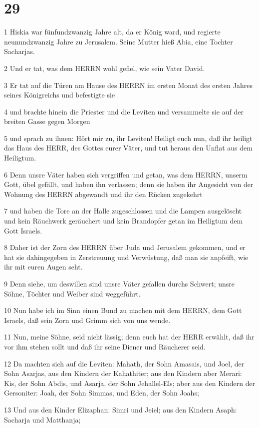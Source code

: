 \chapter{29}

\par 1 Hiskia war fünfundzwanzig Jahre alt, da er König ward, und regierte neunundzwanzig Jahre zu Jerusalem. Seine Mutter hieß Abia, eine Tochter Sacharjas.
\par 2 Und er tat, was dem HERRN wohl gefiel, wie sein Vater David.
\par 3 Er tat auf die Türen am Hause des HERRN im ersten Monat des ersten Jahres seines Königreichs und befestigte sie
\par 4 und brachte hinein die Priester und die Leviten und versammelte sie auf der breiten Gasse gegen Morgen
\par 5 und sprach zu ihnen: Hört mir zu, ihr Leviten! Heiligt euch nun, daß ihr heiligt das Haus des HERR, des Gottes eurer Väter, und tut heraus den Unflat aus dem Heiligtum.
\par 6 Denn unsre Väter haben sich vergriffen und getan, was dem HERRN, unserm Gott, übel gefällt, und haben ihn verlassen; denn sie haben ihr Angesicht von der Wohnung des HERRN abgewandt und ihr den Rücken zugekehrt
\par 7 und haben die Tore an der Halle zugeschlossen und die Lampen ausgelöscht und kein Räuchwerk geräuchert und kein Brandopfer getan im Heiligtum dem Gott Israels.
\par 8 Daher ist der Zorn des HERRN über Juda und Jerusalem gekommen, und er hat sie dahingegeben in Zerstreuung und Verwüstung, daß man sie anpfeift, wie ihr mit euren Augen seht.
\par 9 Denn siehe, um deswillen sind unsre Väter gefallen durchs Schwert; unsre Söhne, Töchter und Weiber sind weggeführt.
\par 10 Nun habe ich im Sinn einen Bund zu machen mit dem HERRN, dem Gott Israels, daß sein Zorn und Grimm sich von uns wende.
\par 11 Nun, meine Söhne, seid nicht lässig; denn euch hat der HERR erwählt, daß ihr vor ihm stehen sollt und daß ihr seine Diener und Räucherer seid.
\par 12 Da machten sich auf die Leviten: Mahath, der Sohn Amasais, und Joel, der Sohn Asarjas, aus den Kindern der Kahathiter; aus den Kindern aber Merari: Kis, der Sohn Abdis, und Asarja, der Sohn Jehallel-Els; aber aus den Kindern der Gersoniter: Joah, der Sohn Simmas, und Eden, der Sohn Joahs;
\par 13 Und aus den Kinder Elizaphan: Simri und Jeiel; aus den Kindern Asaph: Sacharja und Matthanja;
